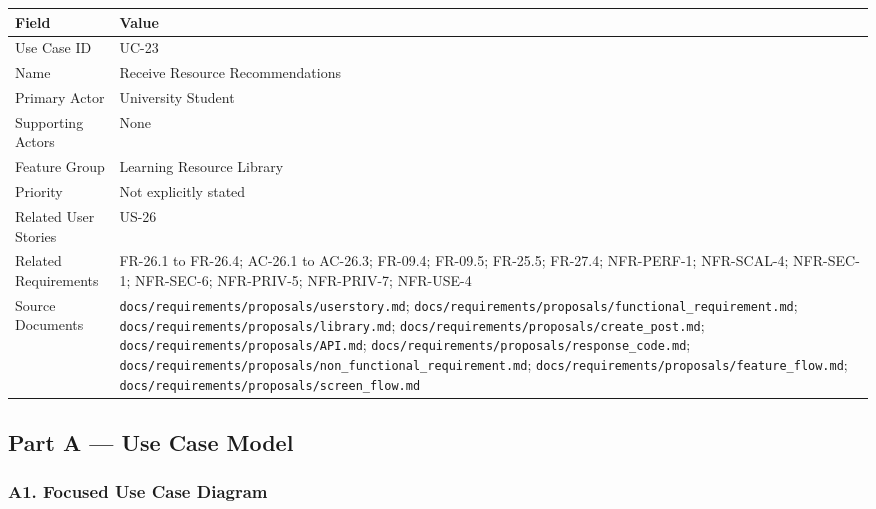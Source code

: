 \documentclass[12pt]{article}
\renewcommand{\baselinestretch}{1.5}
\begin{document}
\begingroup
\small
\renewcommand{\baselinestretch}{1.0}\selectfont
\renewcommand{\arraystretch}{1.15}
\setlength{\tabcolsep}{6pt}
\begin{longtable}{|>{\raggedright\arraybackslash}p{}|>{\raggedright\arraybackslash}p{}|}
\hline
\textbf{Field} & \textbf{Value} \\ \hline
\endhead
Use Case ID & UC-23 \\ \hline
Name & Receive Resource Recommendations \\ \hline
Primary Actor & University Student \\ \hline
Supporting Actors & None \\ \hline
Feature Group & Learning Resource Library \\ \hline
Priority & Not explicitly stated \\ \hline
Related User Stories & US-26 \\ \hline
Related Requirements & FR-26.1 to FR-26.4; AC-26.1 to AC-26.3; FR-09.4; FR-09.5; FR-25.5; FR-27.4; NFR-PERF-1; NFR-SCAL-4; NFR-SEC-1; NFR-SEC-6; NFR-PRIV-5; NFR-PRIV-7; NFR-USE-4 \\ \hline
Source Documents & \texttt{docs/requirements/proposals/userstory.md}; \texttt{docs/requirements/proposals/functional\_requirement.md}; \texttt{docs/requirements/proposals/library.md}; \texttt{docs/requirements/proposals/create\_post.md}; \texttt{docs/requirements/proposals/API.md}; \texttt{docs/requirements/proposals/response\_code.md}; \texttt{docs/requirements/proposals/non\_functional\_requirement.md}; \texttt{docs/requirements/proposals/feature\_flow.md}; \texttt{docs/requirements/proposals/screen\_flow.md} \\ \hline
\end{longtable}
\endgroup
\par\medskip

\hypertarget{sec:part-a-use-case-model}{}
\subsection*{Part A --- Use Case Model}
\par\medskip

\hypertarget{sec:a1-focused-use-case-diagram}{}
\subsubsection*{A1. Focused Use Case Diagram}
\par\medskip
\end{document}
